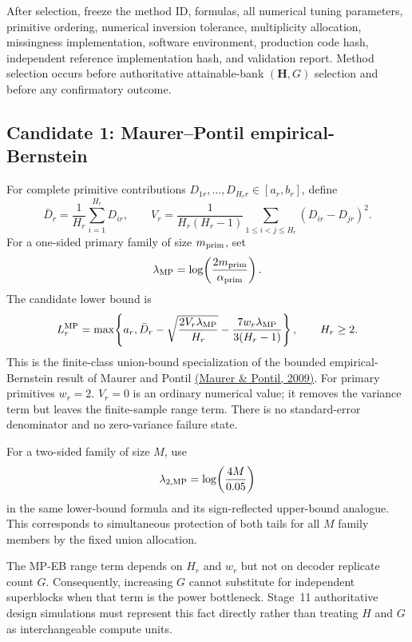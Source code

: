 \documentclass[11pt,a4paper]{article}
\begin{document}
After selection, freeze the method ID, formulas, all numerical tuning parameters, primitive ordering, numerical inversion tolerance, multiplicity allocation, missingness implementation, software environment, production code hash, independent reference implementation hash, and validation report. Method selection occurs before authoritative attainable-bank $(\mathbf H,G)$ selection and before any confirmatory outcome.

\subsection{Candidate 1: Maurer--Pontil empirical-Bernstein}
For complete primitive contributions $D_{1r},\ldots,D_{H_rr}\in[a_r,b_r]$, define
\[
\bar D_r=\frac1{H_r}\sum_{i=1}^{H_r}D_{ir},
\qquad
V_r=\frac{1}{H_r(H_r-1)}\sum_{1\le i<j\le H_r}(D_{ir}-D_{jr})^2.
\]
For a one-sided primary family of size $m_{\rm prim}$, set
\[
\lambda_{\rm MP}=\log\!\left(\frac{2m_{\rm prim}}{\alpha_{\rm prim}}\right).
\]
The candidate lower bound is
\[
L_r^{\rm MP}
=\max\!\left\{a_r,
\bar D_r-\sqrt{\frac{2V_r\lambda_{\rm MP}}{H_r}}
-\frac{7w_r\lambda_{\rm MP}}{3(H_r-1)}\right\},
\qquad H_r\ge2.
\]
This is the finite-class union-bound specialization of the bounded empirical-Bernstein result of Maurer and Pontil \href{https://arxiv.org/abs/0907.3740}{(Maurer \& Pontil, 2009)}. For primary primitives $w_r=2$. $V_r=0$ is an ordinary numerical value; it removes the variance term but leaves the finite-sample range term. There is no standard-error denominator and no zero-variance failure state.

For a two-sided family of size $M$, use
\[
\lambda_{2,\rm MP}=\log\!\left(\frac{4M}{0.05}\right)
\]
in the same lower-bound formula and its sign-reflected upper-bound analogue. This corresponds to simultaneous protection of both tails for all $M$ family members by the fixed union allocation.

The MP-EB range term depends on $H_r$ and $w_r$ but not on decoder replicate count $G$. Consequently, increasing $G$ cannot substitute for independent superblocks when that term is the power bottleneck. Stage~11 authoritative design simulations must represent this fact directly rather than treating $H$ and $G$ as interchangeable compute units.
\end{document}
